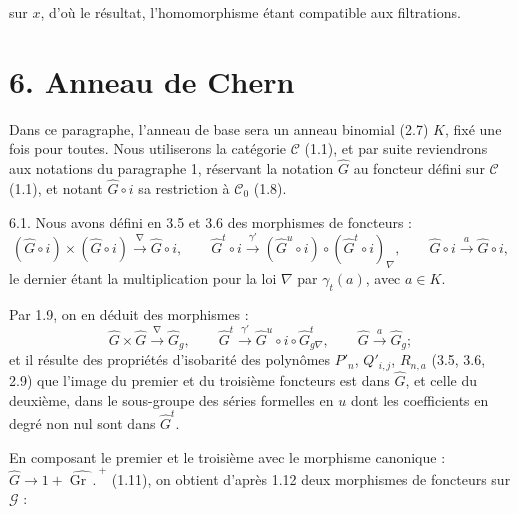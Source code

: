 
sur \(x\), d'où le
résultat, l'homomorphisme étant compatible aux filtrations.

\section*{6. Anneau de Chern}

Dans ce paragraphe, l'anneau de base sera un anneau binomial (2.7) \(K\), fixé une fois pour toutes. Nous utiliserons la catégorie \(\mathcal C\) (1.1), et par suite reviendrons aux notations du paragraphe 1, réservant la notation \(\widehat G\) au foncteur défini sur \(\mathcal C\) (1.1), et notant \(\widehat G\circ i\) sa restriction à \(\mathcal C_0\) (1.8).

6.1. Nous avons défini en 3.5 et 3.6 des morphismes de foncteurs :
\[
  (\widehat G\circ i)\times(\widehat G\circ i)\xrightarrow{\nabla}\widehat G\circ i,
  \qquad
  \widehat G^t\circ i\xrightarrow{\gamma'}(\widehat G^u\circ i)\circ(\widehat G^t\circ i)_\nabla,
  \qquad
  \widehat G\circ i\xrightarrow{a}\widehat G\circ i,
\]
le dernier étant la multiplication pour la loi \(\nabla\) par \(\gamma_t(a)\), avec \(a\in K\).

Par 1.9, on en déduit des morphismes :
\[
  \widehat G\times\widehat G\xrightarrow{\nabla}\widehat G_g,
  \qquad
  \widehat G^t\xrightarrow{\gamma'}\widehat G^u\circ i\circ\widehat G^t_{g\nabla},
  \qquad
  \widehat G\xrightarrow{a}\widehat G_g;
\]
et il résulte des propriétés d'isobarité des polynômes \(P'_n\), \(Q'_{i,j}\), \(R_{n,a}\) (3.5, 3.6, 2.9) que l'image du premier et du troisième foncteurs est dans \(\widehat G\), et celle du deuxième, dans le sous-groupe des séries formelles en \(u\) dont les coefficients en degré non nul sont dans \(\widehat G^t\).

En composant le premier et le troisième avec le morphisme canonique : \(\widehat G\longrightarrow 1+\widehat{\operatorname{Gr}\,\mathord{.}\,}^{+}\) (1.11), on obtient d'après 1.12 deux morphismes de
foncteurs sur \(\mathcal G\) :
